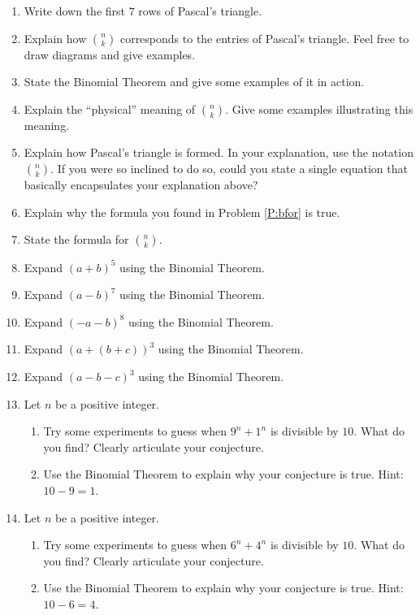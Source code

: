 \newpage
\begin{problems}
\begin{enumerate}
\item Write down the first $7$ rows of Pascal's triangle.
\item Explain how $\binom{n}{k}$ corresponds to the entries of Pascal's
  triangle. Feel free to draw diagrams and give examples.
\item State the Binomial Theorem and give some examples of it in action.
\item Explain the ``physical'' meaning of $\binom{n}{k}$. Give some
  examples illustrating this meaning.
\item\label{P:bfor} Explain how Pascal's triangle is formed. In your
  explanation, use the notation $\binom{n}{k}$. If you were so
  inclined to do so, could you state a single equation that basically
  encapsulates your explanation above?
\item Explain why the formula you found in Problem \ref{P:bfor} is
  true.
\item State the formula for $\binom{n}{k}$.
\item Expand $(a + b)^5$ using the Binomial Theorem.
\item Expand $(a - b)^7$ using the Binomial Theorem.
\item Expand $(-a - b)^8$ using the Binomial Theorem.
\item Expand $(a + (b + c))^3$ using the Binomial Theorem.
\item Expand $(a - b - c)^3$ using the Binomial Theorem.
\item\label{P:exp1} Let $n$ be a positive integer.
\begin{enumerate}
\item Try some experiments to guess when $9^n + 1^n$ is
  divisible by $10$. What do you find? Clearly articulate your
  conjecture.
\item Use the Binomial Theorem to explain why your conjecture is
  true. Hint: $10-9 = 1$.
\end{enumerate}
\item\label{P:exp2} Let $n$ be a positive integer.
\begin{enumerate}
\item Try some experiments to guess when $6^n + 4^n$ is divisible by
  $10$. What do you find? Clearly articulate your conjecture.
\item Use the Binomial Theorem to explain why your conjecture is
  true. Hint: $10-6 = 4$.
\end{enumerate}

\end{enumerate}
\end{problems}
